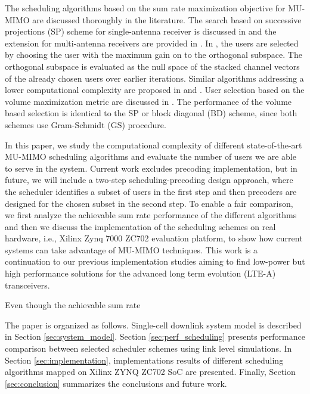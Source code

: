 \documentclass[conference]{./../../IEEE/IEEEtran}
\begin{document}
The scheduling algorithms based on the sum rate maximization objective for \ac{MU-MIMO} are discussed thoroughly in the literature. The search based on successive projections (SP) scheme for single-antenna receiver is discussed in \cite{sus2006zfbf} and the extension for multi-antenna receivers are provided in \cite{Tolli-etal-2005}. In \cite{Tolli-etal-2005}, the users are selected by choosing the user with the maximum gain on to the orthogonal subspace. The orthogonal subspace is evaluated as the null space of the stacked channel vectors of the already chosen users over earlier iterations. Similar algorithms addressing a lower computational complexity are proposed in \cite{shen2006low} and \cite{youtuan2007improved}. User selection based on the volume maximization metric are discussed in \cite{jin2010novel}. The performance of the volume based selection is identical to the SP or block diagonal (BD) scheme, since both schemes use Gram-Schmidt (GS) procedure.

In this paper, we study the computational complexity of different state-of-the-art \ac{MU-MIMO} scheduling algorithms and evaluate the number of users we are able to serve in the system. Current work excludes precoding implementation, but in future, we will include a two-step scheduling-precoding design approach, where the scheduler identifies a subset of users in the first step and then precoders are designed for the chosen subset in the second step. To enable a fair comparison, we first analyze the achievable sum rate performance of the different algorithms and then we discuss the implementation of the scheduling schemes on real hardware, i.e., Xilinx Zynq 7000 ZC702 evaluation platform, to show how current systems can take advantage of \ac{MU-MIMO} techniques. This work is a continuation to our previous implementation studies \cite{Janhunen-etal-11, Hanninen-etal-2014, Shahabuddin-etal-2014} aiming to find low-power but high performance solutions for the advanced long term evolution (LTE-A) transceivers.

Even though the achievable sum rate 

The paper is organized as follows. Single-cell downlink system model is described in Section \ref{sec:system_model}. Section \ref{sec:perf_scheduling} presents performance comparison between selected scheduler schemes using link level simulations. In Section \ref{sec:implementation}, implementations results of different scheduling algorithms mapped on Xilinx ZYNQ ZC702 \ac{SoC} are presented. Finally, Section \ref{sec:conclusion} summarizes the conclusions and future work.
\end{document}
